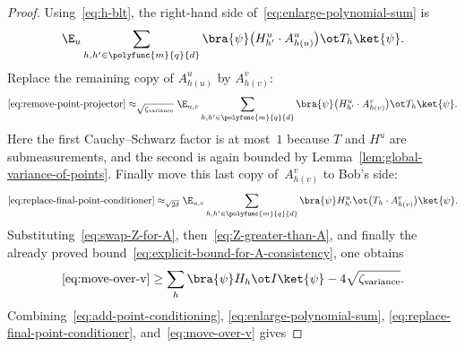 \begin{proof}
  Using~\eqref{eq:h-blt}, the right-hand side of~\eqref{eq:enlarge-polynomial-sum} is
  \begin{equation}\label{eq:remove-point-projector}
    \E_{u} \sum_{h, h' \in \polyfunc{m}{q}{d}} \bra{\psi} \bigl(H^{u}_{h'} \cdot A^{u}_{h(u)}\bigr) \ot T_h \ket{\psi}.
  \end{equation}
  Replace the remaining copy of $A^u_{h(u)}$ by $A^v_{h(v)}$:
  \begin{equation}\label{eq:replace-final-point-conditioner}
    \eqref{eq:remove-point-projector}
    \approx_{\sqrt{\zeta_{\mathrm{variance}}}}
    \E_{u,v} \sum_{h, h' \in \polyfunc{m}{q}{d}} \bra{\psi} \bigl(H^{u}_{h'} \cdot A^{v}_{h(v)}\bigr) \ot T_h \ket{\psi}.
  \end{equation}
  Here the first Cauchy--Schwarz factor is at most~$1$ because $T$ and $H^u$ are submeasurements, and the second is again bounded by Lemma~\ref{lem:global-variance-of-points}. Finally move this last copy of~$A^v_{h(v)}$ to Bob's side:
  \begin{equation}\label{eq:move-over-v}
    \eqref{eq:replace-final-point-conditioner}
    \approx_{\sqrt{2\delta}}
    \E_{u,v} \sum_{h, h' \in \polyfunc{m}{q}{d}} \bra{\psi} H^{u}_{h'}  \ot \bigl(T_h \cdot A^{v}_{h(v)}\bigr) \ket{\psi}.
  \end{equation}
  Substituting~\eqref{eq:swap-Z-for-A}, then~\eqref{eq:Z-greater-than-A}, and finally the already proved bound~\eqref{eq:explicit-bound-for-A-consistency}, one obtains
  \[
    \eqref{eq:move-over-v}
    \ge \sum_h \bra{\psi} H_h \ot I \ket{\psi} - 4\sqrt{\zeta_{\mathrm{variance}}}.
  \]
  Combining~\eqref{eq:add-point-conditioning}, \eqref{eq:enlarge-polynomial-sum}, \eqref{eq:replace-final-point-conditioner}, and~\eqref{eq:move-over-v} gives

\end{proof}
